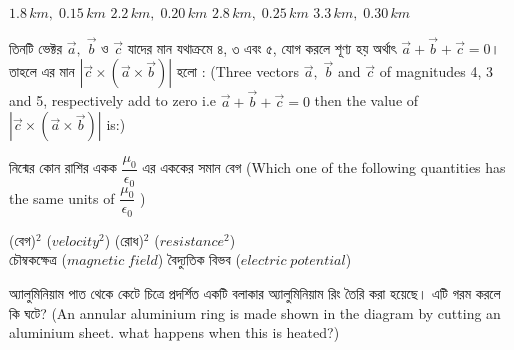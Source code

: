 \documentclass[addpoints]{exam}
\begin{document}
\begin{questions}
\begin{oneparchoices}
\choice $ 1.8\,km,\; 0.15\,km$
\choice $ 2.2\,km,\; 0.20\,km $
\choice $ 2.8\,km,\; 0.25\,km $
\choice  $ 3.3\,km,\; 0.30\,km $
\end{oneparchoices}



\question  তিনটি ভেক্টর $ \vec{a},\; \vec{b} $ ও $ \vec{c} $ যাদের মান যথাক্রমে ৪, ৩  এবং ৫, যোগ করলে শূণ্য হয় অর্থাৎ $ \vec{a}+\vec{b}+\vec{c} =0  $। তাহলে এর মান $ |\vec{c}\times (\vec{a}\times \vec{b})| $ হলো : (Three vectors $ \vec{a},\; \vec{b} $ and $ \vec{c} $ of magnitudes 4, 3 and 5, respectively add to zero i.e $ \vec{a}+\vec{b}+\vec{c} =0  $ then the value of $ |\vec{c}\times (\vec{a}\times \vec{b})| $ is:)

\begin{oneparchoices}
\end{oneparchoices}

\question  নিন্মের কোন রাশির একক $ \dfrac{\mu_{0}}{\epsilon_{0}} $ এর এককের সমান বেগ (Which one of the following quantities has the same units of $ \dfrac{\mu_{0}}{\epsilon_{0}} $ )

\begin{oneparchoices}
\choice (বেগ)$ ^{2} $ ($ velocity^{2} $)
\hspace*{1.4cm}\choice  (রোধ)$ ^{2} $ ($ resistance^{2} $)\\
\hspace*{-.32cm}\choice  চৌম্বকক্ষেত্র ($ magnetic\; field $)
\choice  বৈদ্যুতিক বিভব ($ electric\; potential $)
\end{oneparchoices}

\question   অ্যালুমিনিয়াম পাত থেকে কেটে চিত্রে প্রদর্শিত একটি বলাকার অ্যালুমিনিয়াম রিং তৈরি করা হয়েছে। এটি গরম করলে কি ঘটে? (An annular aluminium ring is made shown in the diagram by cutting an aluminium sheet. what happens when this is heated?)


\end{questions}
\end{document}

